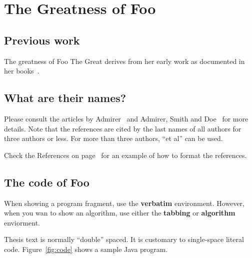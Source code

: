 \documentclass[proposal]{bsu-ms}
\begin{document}
%
%

\chapter{The Greatness of Foo}\label{ch:fooGreatness}

\section{Previous work}
The greatness of Foo The Great derives from her early work as documented in
her books~\cite{foo:book1,foo:book2}.

\section{What are their names?}
Please consult the articles by Admirer~\cite{me:paper1} and Admirer,
Smith and Doe~\cite{me:paper2} for more details. Note that the references are
cited by the last names of all authors for three authors or less. For more
than three authors, ``et al'' can be used. 

Check the References on page~\pageref{references} for an example of how to
format the references. 

\section{The code of Foo}

When showing a program fragment, use the \textbf{verbatim}
environment. However, when you wan to show an algorithm, use either the
\textbf{tabbing} or \textbf{algorithm} enviorment.

Thesis text is normally ``double'' spaced.  It is customary to single-space
literal code.  Figure~\ref{fig:code} shows a sample Java program.
\end{document}
